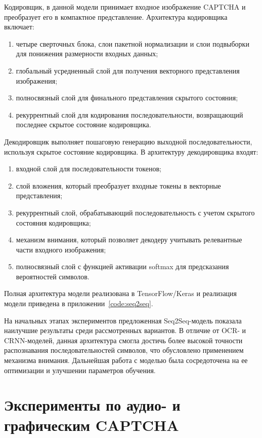 Кодировщик, в данной модели принимает входное изображение CAPTCHA и преобразует 
его в компактное представление. Архитектура кодировщика включает:
\begin{enumerate}
    \item четыре сверточных блока, слои пакетной нормализации и слои подвыборки 
    для понижения размерности входных данных;
    \item глобальный усредненный слой для получения векторного представления 
    изображения;
    \item полносвязный слой для финального представления скрытого состояния;
    \item рекуррентный слой для кодирования последовательности, возвращающий 
    последнее скрытое состояние кодировщика.
\end{enumerate}

Декодировщик выполняет пошаговую генерацию выходной последовательности, используя 
скрытое состояние кодировщика. В архитектуру декодировщика входят:
\begin{enumerate}
    \item входной слой для последовательности токенов;
    \item слой вложения, который преобразует входные токены в векторные 
    представления;
    \item рекуррентный слой, обрабатывающий последовательность с учетом скрытого 
    состояния кодировщика;
    \item механизм внимания, который позволяет декодеру учитывать релевантные 
    части входного изображения;
    \item полносвязный слой с функцией активации softmax для предсказания 
    вероятностей символов.
\end{enumerate}

Полная архитектура модели реализована в TensorFlow/Keras и реализация модели 
приведена в приложении~\ref{code:seq2seq}.

На начальных этапах экспериментов предложенная Seq2Seq-модель показала наилучшие 
результаты среди рассмотренных вариантов. В отличие от OCR- и CRNN-моделей, 
данная архитектура смогла достичь более высокой точности распознавания 
последовательностей символов, что обусловлено применением механизма внимания. 
Дальнейшая работа с моделью была сосредоточена на ее оптимизации и улучшении 
параметров обучения.

\section{Эксперименты по аудио- и графическим CAPTCHA}

